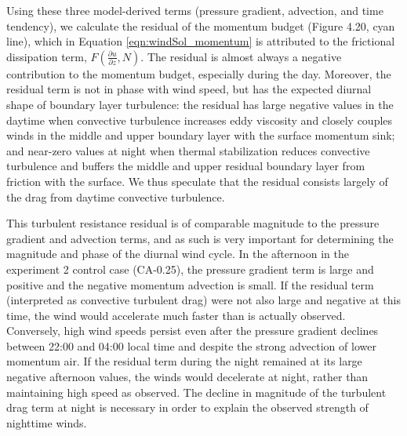 Using these three model-derived terms (pressure gradient, advection, and time tendency), we calculate the residual of the momentum budget (Figure  4.20, cyan line), which in Equation \ref{eqn:windSol_momentum} is attributed to the frictional dissipation term, $F\left(\frac{\partial u}{\partial z}, N\right)$. The residual is almost always a negative contribution to the momentum budget, especially during the day.  Moreover, the residual term is not in phase with wind speed, but has the expected diurnal shape of boundary layer turbulence: the residual has large negative values in the daytime when convective turbulence increases eddy viscosity and closely couples winds in the middle and upper boundary layer with the surface momentum sink; and near-zero values at night when thermal stabilization reduces convective turbulence and buffers the middle and upper residual boundary layer from friction with the surface.  We thus speculate that the residual consists largely of the drag from daytime convective turbulence.

This turbulent resistance residual is of comparable magnitude to the pressure gradient and advection terms, and as such is very important for determining the magnitude and phase of the diurnal wind cycle.  In the afternoon in the experiment 2 control case (CA-0.25), the pressure gradient term is large and positive and the negative momentum advection is small.  If the residual term (interpreted as convective turbulent drag) were not also large and negative at this time, the wind would accelerate much faster than is actually observed.  Conversely, high wind speeds persist even after the pressure gradient declines between 22:00 and 04:00 local time and despite the strong advection of lower momentum air.  If the residual term during the night remained at its large negative afternoon  values, the winds would decelerate at night, rather than maintaining high speed as observed.  The decline in magnitude of the turbulent drag term at night is necessary in order to explain the observed strength of nighttime winds.

